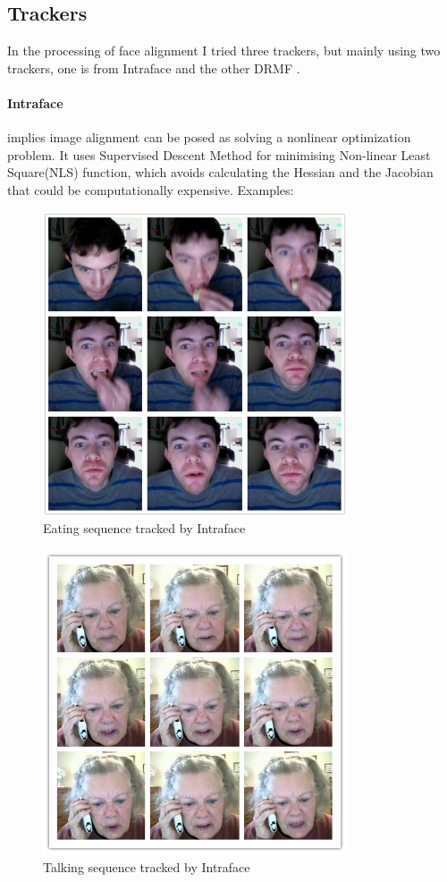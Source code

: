 \subsection{Trackers}
In the processing of face alignment I tried three trackers, but mainly using two trackers, one is from Intraface \cite{xiong2013supervised} and the other DRMF \cite{asthana2013robust}. 
\paragraph{Intraface}
\cite{xiong2013supervised} implies image alignment  can be posed as solving a nonlinear optimization problem. It uses Supervised Descent Method for minimising Non-linear Least Square(NLS) function, which avoids calculating the Hessian and the Jacobian that could be computationally expensive.
\newline
Examples:
\begin{figure}[ht!]
\centering
\includegraphics[width=90mm]{imgs/Tracking_Intraface_eating_red.png}
\caption{Eating sequence tracked by Intraface}
\end{figure}

\begin{figure}[ht!]
\centering
\includegraphics[width=90mm]{imgs/Talking_Intraface_140711_176_184.png}
\caption{Talking sequence tracked by Intraface}
\end{figure}

